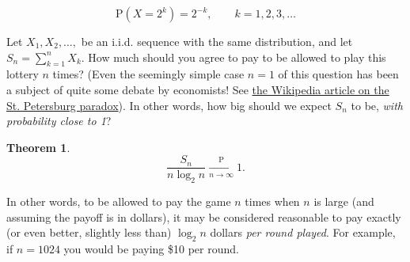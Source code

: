 \documentclass[11pt]{report}
\theoremstyle{plain}
\newtheorem{thm}{Theorem}[chapter]
\theoremstyle{definition}
\begin{document}
\[
\mathrm{P}(X=2^k) = 2^{-k}, \qquad k=1,2,3,\ldots
\]

Let $X_1,X_2,\ldots,$ be an i.i.d. sequence with the
same distribution, and let $S_n = \sum_{k=1}^n X_k$.
How much should you agree to pay to be allowed to play
this lottery $n$ times? (Even the seemingly simple
case $n=1$ of this question  has been a subject of
quite some debate by economists! See \href{http://en.wikipedia.org/wiki/St._Petersburg_paradox}{the Wikipedia
article on the St. Petersburg
paradox}).
In other words, how big should we expect $S_n$ to be,
\emph{with probability close to 1}?

\begin{thm}

\[
\frac{S_n}{n\log_2 n} \xrightarrow[n\to\infty]{\mathrm{P}} 1.
\]

\end{thm}

In other words, to be allowed to pay the game $n$
times when $n$ is large (and assuming the payoff is
in dollars), it may be considered reasonable to pay
exactly (or even better, slightly less than)
$\log_2 n$ dollars \emph{per round played}. For example,
if $n=1024$ you would be paying \$10 per round.
\end{document}
